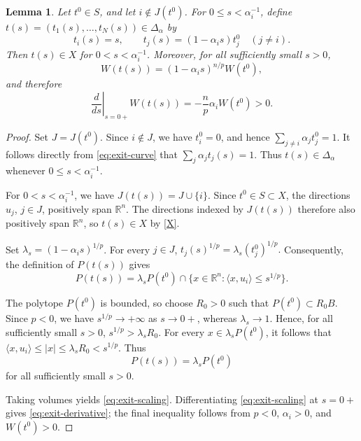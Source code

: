 \documentclass[12pt,reqno]{amsart}
\numberwithin{equation}{section}
\newtheorem{lemma}[theorem]{Lemma}
\theoremstyle{remark}
\newcommand{\R}{\mathbb R}
\begin{document}
\begin{lemma}\label{lem:exit-derivative}
	Let \(t^0\in S\), and let \(i\notin J(t^0)\). For
	\(0\leq s<\alpha_i^{-1}\), define \(t(s)=(t_1(s),\ldots,t_N(s))\in\Delta_\alpha\) by
	\begin{equation}\label{eq:exit-curve}
		t_i(s)=s,
		\qquad
		t_j(s)=(1-\alpha_i s)t_j^0
		\quad(j\neq i).
	\end{equation}
	Then \(t(s)\in X\) for \(0<s<\alpha_i^{-1}\). Moreover, for all
	sufficiently small \(s>0\),
	\begin{equation}\label{eq:exit-scaling}
		W(t(s))
		=
		(1-\alpha_i s)^{n/p}W(t^0),
	\end{equation}
	and therefore
	\begin{equation}\label{eq:exit-derivative}
		\left.\frac{d}{ds}\right|_{s=0+}W(t(s))
		=
		-\frac np\alpha_iW(t^0)>0.
	\end{equation}
\end{lemma}

\begin{proof}
	Set \(J=J(t^0)\). Since \(i\notin J\), we have \(t_i^0=0\), and
	hence \(\sum_{j\neq i}\alpha_jt_j^0=1\). It follows directly from
	\eqref{eq:exit-curve} that
	\(\sum_j\alpha_jt_j(s)=1\). Thus \(t(s)\in\Delta_\alpha\) whenever
	\(0\leq s<\alpha_i^{-1}\).
	
	For \(0<s<\alpha_i^{-1}\), we have
	\(J(t(s))=J\cup\{i\}\). Since \(t^0\in S\subset X\), the directions
	\(u_j\), \(j\in J\), positively span \(\R^n\). The directions
	indexed by \(J(t(s))\) therefore also positively span \(\R^n\), so
	\(t(s)\in X\) by \eqref{X}.
	
	Set \(\lambda_s=(1-\alpha_i s)^{1/p}\). For every \(j\in J\),
	\(
	t_j(s)^{1/p}
	=
	\lambda_s(t_j^0)^{1/p}.
	\)
	Consequently, the definition of \(P(t(s))\) gives
	\[
	P(t(s))
	=
	\lambda_sP(t^0)
	\cap
	\{x\in\R^n:\langle x,u_i\rangle\leq s^{1/p}\}.
	\]
	
	The polytope \(P(t^0)\) is bounded, so choose \(R_0>0\) such that
	\(P(t^0)\subset R_0B\). Since \(p<0\), we have
	\(s^{1/p}\to+\infty\) as \(s\to0+\), whereas
	\(\lambda_s\to1\). Hence, for all sufficiently small \(s>0\),
	\(s^{1/p}>\lambda_sR_0\). For every
	\(x\in\lambda_sP(t^0)\), it follows that
	\(\langle x,u_i\rangle\leq|x|\leq\lambda_sR_0<s^{1/p}\).
	Thus
	\[
	P(t(s))=\lambda_sP(t^0)
	\]
	for all sufficiently small \(s>0\).
	
	Taking volumes yields \eqref{eq:exit-scaling}. Differentiating
	\eqref{eq:exit-scaling} at \(s=0+\) gives
	\eqref{eq:exit-derivative}; the final inequality follows from
	\(p<0\), \(\alpha_i>0\), and \(W(t^0)>0\).
\end{proof}
\end{document}
